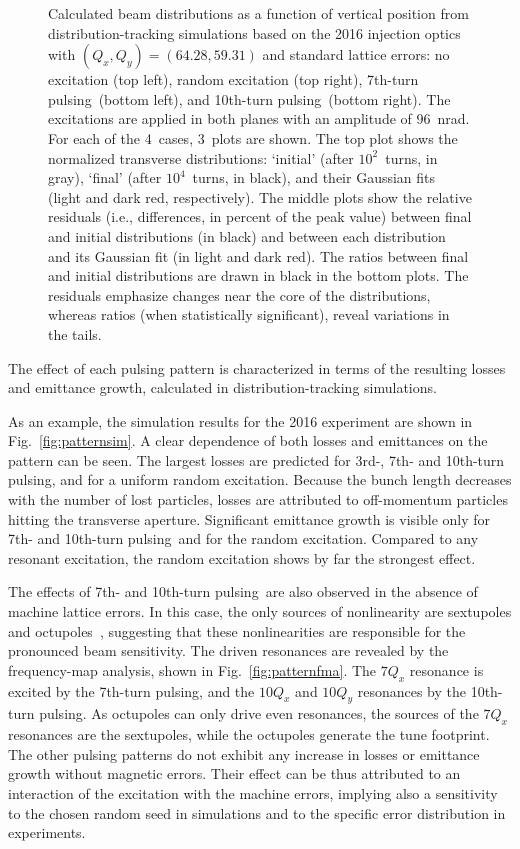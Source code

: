 \documentclass[aps
,prstab
,reprint
,longbibliography
,preprintnumbers
,showkeys
,amsfonts,amssymb,amsmath
,floatfix
]{revtex4-1}
\newcommand{\seventhtp}{7th-turn pulsing}
\newcommand{\tenthtp}{10th-turn pulsing}
\begin{document}
\begin{figure}
\begin{tabular}{cc}
  \end{tabular}
  \caption{Calculated beam distributions as a function of vertical
    position from distribution-tracking simulations based on the 2016
    injection optics with $(Q_x, Q_y) = (64.28, 59.31)$ and standard
    lattice errors: no excitation (top left), random excitation (top
    right), \seventhtp\ (bottom left), and
    \tenthtp\ (bottom right). The excitations
    are applied in both planes with an amplitude of 96~nrad. For each
    of the 4~cases, 3~plots are shown. The top plot shows the
    normalized transverse distributions: `initial' (after
    $10^2$~turns, in gray), `final' (after $10^4$~turns, in black),
    and their Gaussian fits (light and dark red, respectively). The
    middle plots show the relative residuals (i.e., differences, in
    percent of the peak value) between final and initial distributions
    (in black) and between each distribution and its Gaussian fit (in
    light and dark red). The ratios between final and initial
    distributions are drawn in black in the bottom plots. The
    residuals emphasize changes near the core of the distributions,
    whereas ratios (when statistically significant), reveal variations
    in the tails.}
  \label{fig:patternhist}
\end{figure}


The effect of each pulsing pattern is characterized in terms of the
resulting losses and emittance growth, calculated in
distribution-tracking simulations.

As an example, the simulation results for the 2016 experiment are
shown in Fig.~\ref{fig:patternsim}.  A clear dependence of both losses
and emittances on the pattern can be seen.  The largest losses are
predicted for 3rd-, 7th- and \tenthtp, and for a uniform random
excitation. Because the bunch length decreases with the number of lost
particles, losses are attributed to off-momentum particles hitting the
transverse aperture. Significant emittance growth is visible only for
7th- and \tenthtp\ and for the random excitation. Compared to any
resonant excitation, the random excitation shows by far the strongest
effect.

The effects of 7th- and \tenthtp\ are also observed in the absence of
machine lattice errors. In this case, the only sources of nonlinearity
are sextupoles and octupoles~\cite{md_sim_hel_res_ex_fitterer},
suggesting that these nonlinearities are responsible for the
pronounced beam sensitivity. The driven resonances are revealed by the
frequency-map analysis, shown in Fig.~\ref{fig:patternfma}. The
$7 Q_x$ resonance is excited by the \seventhtp, and the $10 Q_x$ and
$10 Q_y$ resonances by the \tenthtp. As octupoles can only drive even
resonances, the sources of the $7 Q_x$ resonances are the sextupoles,
while the octupoles generate the tune footprint. The other pulsing
patterns do not exhibit any increase in losses or emittance growth
without magnetic errors. Their effect can be thus attributed to an
interaction of the excitation with the machine errors, implying also a
sensitivity to the chosen random seed in simulations and to the
specific error distribution in experiments.
\end{document}
